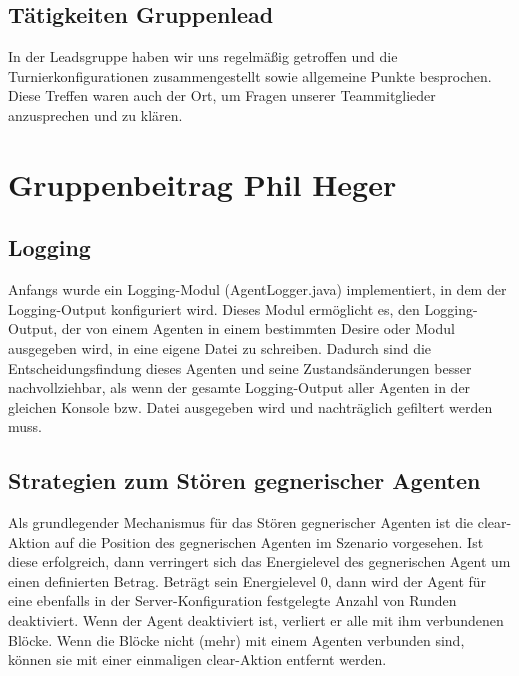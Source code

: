 \documentclass[runningheads]{llncs}
\begin{document}
\subsection{Tätigkeiten Gruppenlead}
In der Leadsgruppe haben wir uns regelmäßig getroffen und die Turnierkonfigurationen zusammengestellt sowie allgemeine Punkte besprochen. Diese Treffen waren auch der Ort, um Fragen unserer Teammitglieder anzusprechen und zu klären. 
\section{Gruppenbeitrag Phil Heger}
\subsection{Logging}
Anfangs wurde ein Logging-Modul (AgentLogger.java) implementiert, in dem der Logging-Output konfiguriert wird. Dieses Modul ermöglicht es, den Logging-Output, der von einem Agenten in einem bestimmten Desire oder Modul ausgegeben wird, in eine eigene Datei zu schreiben. Dadurch sind die Entscheidungsfindung dieses Agenten und seine Zustandsänderungen besser nachvollziehbar, als wenn der gesamte Logging-Output aller Agenten in der gleichen Konsole bzw. Datei ausgegeben wird und nachträglich gefiltert werden muss. 

\subsection{Strategien zum Stören gegnerischer Agenten}
Als grundlegender Mechanismus für das Stören gegnerischer Agenten ist die clear-Aktion auf die Position des gegnerischen Agenten im Szenario vorgesehen. Ist diese erfolgreich, dann verringert sich das Energielevel des gegnerischen Agent um einen definierten Betrag. Beträgt sein Energielevel 0, dann wird der Agent für eine ebenfalls in der Server-Konfiguration festgelegte Anzahl von Runden deaktiviert. Wenn der Agent deaktiviert ist, verliert er alle mit ihm verbundenen Blöcke. Wenn die Blöcke nicht (mehr) mit einem Agenten verbunden sind, können sie mit einer einmaligen clear-Aktion entfernt werden. 
\end{document}
